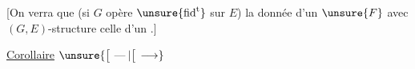 {\footnotesize [On verra que (si $G$ opère $\unsure{\text{fid}^{\mathrm{t}}}$ sur $E$) la donnée d'un   $\unsure{F}$ avec $(G,E)$-structure  celle d'un  .]}

\uline{Corollaire}  $\unsure{\big[\,\mathbin{\text{---}}|\big[\,\longrightarrow}$ 

